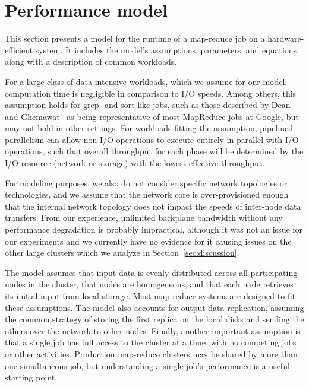 \section{Performance model}
\label{sec:model}

This section presents a model for the runtime of a map-reduce job on a
hardware-efficient system.  It includes the model's assumptions,
parameters, and equations, along with a description of common
workloads.

For a large class of data-intensive workloads, which we assume for our
model, computation time is negligible in comparison to I/O speeds.
Among others, this assumption holds for grep- and sort-like jobs, such
as those described by Dean and Ghemawat~\cite{mapreduce} as being
representative of most MapReduce jobs at Google, but may not hold in
other settings.
For workloads fitting the assumption, pipelined parallelism can allow
non-I/O operations to execute entirely in parallel with I/O operations,
such that overall throughput for each phase will be determined by the
I/O resource (network or storage) with the lowest effective throughput.

For modeling purposes, we also do not consider specific network
topologies or technologies, and we assume that the network core is
over-provisioned enough that the internal network topology does not
impact the speeds of inter-node data transfers.  From our experience,
unlimited backplane bandwidth without any performance degradation is
probably impractical, although it was not an issue for our experiments
and we currently have no evidence for it causing issues on the other
large clusters which we analyze in Section~\ref{sec:discussion}.

The model assumes that input data is evenly distributed across all
participating nodes in the cluster, that nodes are homogeneous, and
that each node retrieves its initial input from local storage.  Most
map-reduce systems are designed to fit these assumptions.
\nocite{tashilocationaware} The model also accounts for output data
replication, assuming the common strategy of storing the first replica
on the local disks and sending the others over the network to other
nodes.  Finally, another important assumption is that a single job has
full access to the cluster at a time, with no competing jobs or other
activities.  Production map-reduce clusters may be shared by more than
one simultaneous job, but understanding a single job's performance is
a useful starting point.

